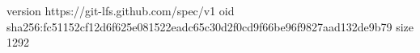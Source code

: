 version https://git-lfs.github.com/spec/v1
oid sha256:fc51152cf12d6f625e081522eadc65c30d2f0cd9f66be96f9827aad132de9b79
size 1292
